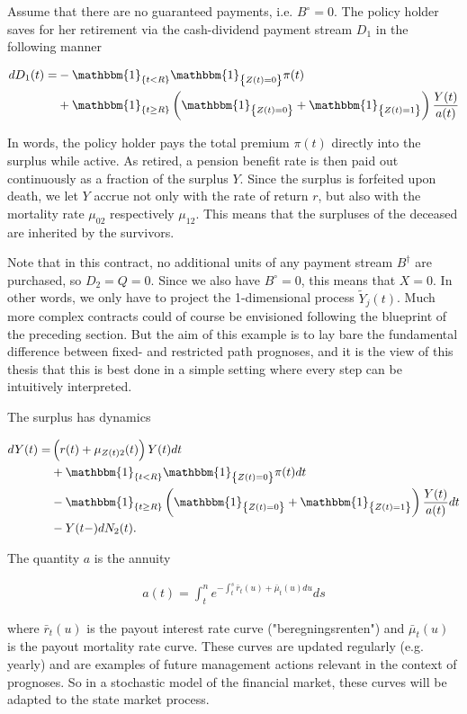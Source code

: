 \documentclass{article}
\newcommand{\1}[1]{\mathbbm{1}_{\left\lbrace #1 \right\rbrace}}
\theoremstyle{break}
\theoremstyle{remark}
\numberwithin{equation}{section}
\begin{document}
Assume that there are no guaranteed payments, i.e. $B^\circ=0$. The policy holder saves for her retirement via the cash-dividend payment stream $D_1$ in the following manner

\begin{align*}
	dD_1(t) =& - \1{t<R} \1{Z(t)=0} \pi(t) \\
	&+ \1{t \geq R} \left( \1{Z(t)=0} + \1{Z(t)=1} \right) \frac{Y(t)}{a(t)}
\end{align*}

In words, the policy holder pays the total premium $\pi(t)$ directly into the surplus while active. As retired, a pension benefit rate is then paid out continuously as a fraction of the surplus $Y$. Since the surplus is forfeited upon death, we let $Y$ accrue not only with the rate of return $r$, but also with the mortality rate $\mu_{02}$ respectively $\mu_{12}$. This means that the surpluses of the deceased are inherited by the survivors.

Note that in this contract, no additional units of any payment stream $B^\dagger$ are purchased, so $D_2=Q=0$. Since we also have $B^\circ=0$, this means that $X=0$. In other words, we only have to project the 1-dimensional process $\tilde{Y}_j(t)$. Much more complex contracts could of course be envisioned following the blueprint of the preceding section. But the aim of this example is to lay bare the fundamental difference between fixed- and restricted path prognoses, and it is the view of this thesis that this is best done in a simple setting where every step can be intuitively interpreted.

The surplus has dynamics

\begin{align} \label{YExampleDyn}
\begin{split}
		dY(t) =& \left( r(t) + \mu_{Z(t)2}(t) \right) Y(t) dt \\
	&+ \1{t<R} \1{Z(t)=0} \pi(t) dt \\
	&- \1{t \geq R} \left( \1{Z(t)=0} + \1{Z(t)=1} \right) \frac{Y(t)}{a(t)} dt \\
	&- Y(t-) dN_2(t).
\end{split}
\end{align}

The quantity $a$ is the annuity

\begin{align*}
	a(t) = \int_t^n e^{-\int_t^s \bar{r}_t(u) + \bar{\mu}_t(u) du} ds
\end{align*}

where $\bar{r}_t(u)$ is the payout interest rate curve ("beregningsrenten") and $\bar{\mu}_t(u)$ is the payout mortality rate curve. These curves are updated regularly (e.g. yearly) and are examples of future management actions relevant in the context of prognoses. So in a stochastic model of the financial market, these curves will be adapted to the state market process.
\end{document}
